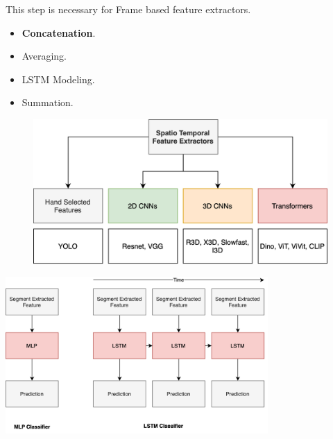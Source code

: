 \begin{frame}

    \vspace{1em}

    This step is necessary for Frame based feature extractors.

    \vspace{1em}

    \begin{itemize}
        \itemsep1em
        \item \textbf{Concatenation}.
        \item Averaging.
        \item LSTM Modeling.
        \item Summation.
    \end{itemize}
\end{frame}

\begin{frame}

    \vspace{1em}

    \begin{figure}
        \centering
        \includegraphics[width=0.85\linewidth]{../../assets/figures/examples-of-spatio-temporal-feature-extractors.png}
    \end{figure}

\end{frame}

\begin{frame}

    \vspace{1em}

    \centering

    \includegraphics[width=0.75\textwidth]{../../assets/figures/classifier.presentation.png}
\end{frame}

